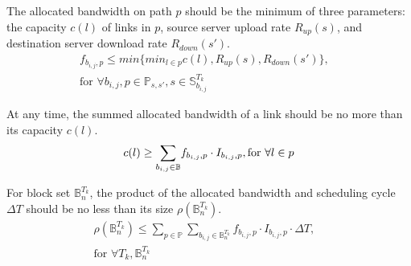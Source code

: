 \begin{packeditemize}

\item The allocated bandwidth on path $p$ should be the minimum of three parameters: the capacity $c(l)$ of links in $p$, source server upload rate $R_{up}(s)$, and destination server download rate $R_{down}(s')$.%
\begin{equation}
\begin{split}
f_{b_{i,j},p} \leq  min \{\displaystyle{min_{l\in p}c(l)},R_{up}(s),R_{down}(s')\},& \\
\text{for }\forall b_{i,j}, p\in \mathbb{P}_{s,s'}, s\in \mathbb{S}^{T_k}_{b_{i,j}}&%
\end{split}
\end{equation}


\item At any time, the summed allocated bandwidth of a link should be no more than its capacity $c(l)$.
\begin{equation}
c(l) \geq \displaystyle{\sum_{b_{i,j} \in \mathbb{B}}} f_{b_{i,j},p} \cdot I_{b_{i,j},p}, \text{for }\forall l\in p\\
\end{equation}

\item For block set $\mathbb{B}^{T_k}_n$, the product of the allocated bandwidth and scheduling cycle $\Delta T$ should be no less than its size $\rho(\mathbb{B}^{T_k}_n)$.
\begin{equation}
\begin{split}
\rho(\mathbb{B}^{T_k}_n) \leq \displaystyle{\sum_{p\in \mathbb{P}}} \displaystyle{\sum_{b_{i,j} \in \mathbb{B}^{T_k}_n}} f_{b_{i,j},p} \cdot I_{b_{i,j},p} \cdot \Delta T,& \\
\text{for }\forall T_k, \mathbb{B}^{T_k}_n &
\end{split}
\end{equation}



\end{packeditemize}
